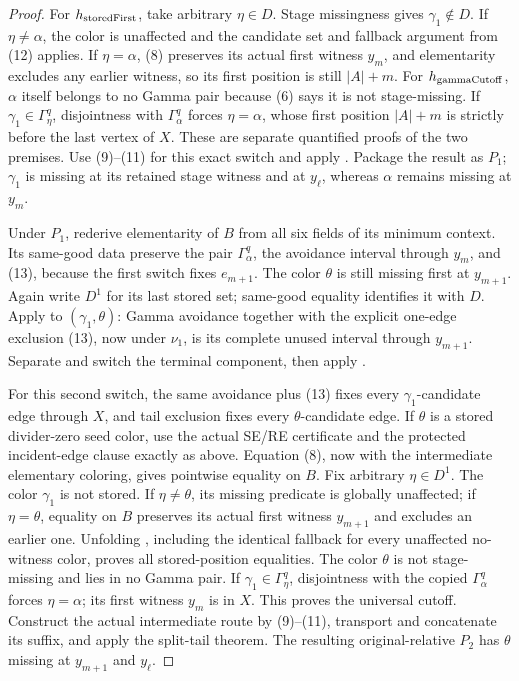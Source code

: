 \begin{proof}
For \(h_{\rm storedFirst}\), take arbitrary \(\eta\in D\).  Stage
missingness gives \(\gamma_1\notin D\).  If \(\eta\ne\alpha\), the color is
unaffected and the candidate set and fallback argument from (12) applies.
If \(\eta=\alpha\), (8) preserves its actual first witness \(y_m\), and
elementarity excludes any earlier witness, so its first position is still
\(|A|+m\).  For \(h_{\rm gammaCutoff}\), \(\alpha\) itself belongs to no Gamma
pair because (6) says it is not stage-missing.  If
\(\gamma_1\in\Gamma^q_\eta\), disjointness with
\(\Gamma^q_\alpha\) forces \(\eta=\alpha\), whose first position
\(|A|+m\) is
strictly before the last vertex of \(X\).  These are separate quantified
proofs of the two premises.  Use (9)--(11) for this exact switch and apply
.  Package the result as \(P_1\);
\(\gamma_1\) is missing at its retained stage witness and at \(y_\ell\),
whereas \(\alpha\) remains missing at \(y_m\).

Under \(P_1\), rederive elementarity of \(B\) from all six fields of its
minimum context.  Its same-good data preserve the pair
\(\Gamma^q_\alpha\), the avoidance interval through \(y_m\), and (13),
because the first switch fixes \(e_{m+1}\).  The color \(\theta\) is still
missing first at \(y_{m+1}\).  Again write \(D^1\) for its last stored set;
same-good equality identifies it with \(D\).  Apply  to
\((\gamma_1,\theta)\): Gamma avoidance together with the explicit
one-edge exclusion (13), now under \(\nu_1\), is its complete unused
interval through \(y_{m+1}\).  Separate and switch the terminal component,
then apply .

For this second switch, the same avoidance plus (13) fixes every
\(\gamma_1\)-candidate edge through \(X\), and tail exclusion fixes every
\(\theta\)-candidate edge.  If \(\theta\) is a stored divider-zero seed
color, use the actual SE/RE certificate and the protected incident-edge
clause exactly as above.  Equation (8), now with the intermediate
elementary coloring, gives pointwise equality on \(B\).  Fix arbitrary
\(\eta\in D^1\).  The color \(\gamma_1\) is not stored.  If
\(\eta\ne\theta\), its missing predicate is globally unaffected; if
\(\eta=\theta\), equality on \(B\) preserves its actual first witness
\(y_{m+1}\) and excludes an earlier one.  Unfolding
, including the identical fallback
for every unaffected no-witness color, proves all stored-position
equalities.  The color \(\theta\) is not stage-missing and lies in no Gamma
pair.  If \(\gamma_1\in\Gamma^q_\eta\), disjointness with the copied
\(\Gamma^q_\alpha\) forces \(\eta=\alpha\); its first witness \(y_m\) is in
\(X\).  This proves the universal cutoff.  Construct the actual
intermediate route by (9)--(11), transport and concatenate its suffix, and
apply the split-tail theorem.  The resulting original-relative \(P_2\)
has \(\theta\) missing at \(y_{m+1}\) and \(y_\ell\).


\end{proof}
